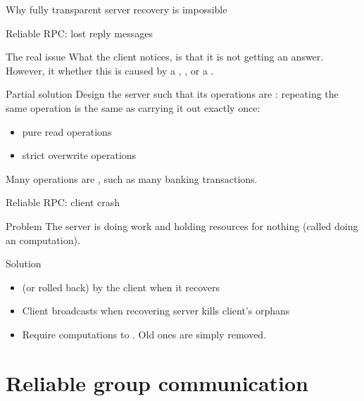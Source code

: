   \begin{slide}{Why fully transparent server recovery is impossible}
    \begin{centerfig}
    \end{centerfig}
  \end{slide}
\begin{slide}{Reliable RPC: lost reply messages}
  \begin{block}{The real issue}
    What the client notices, is that it is not getting an answer. However, it  whether
    this is caused by a , , or a .
  \end{block}
  \begin{block}{Partial solution}
    Design the server such that its operations are : repeating the same operation is the same
    as carrying it out exactly once:
    \begin{itemize}\tightlist
    \item pure read operations
    \item strict overwrite operations 
    \end{itemize}
    Many operations are , such as many banking transactions.
  \end{block}
\end{slide}
\begin{slide}{Reliable RPC: client crash}
  \begin{block}{Problem}
    The server is doing work and holding resources for nothing (called doing an  computation).
  \end{block}
  \begin{block}{Solution}
    \begin{itemize}
    \item {} (or rolled back) by the client when it recovers
    \item Client broadcasts  when recovering \mathexpr{\Rightarrow} server kills
      client's orphans
    \item Require computations to . Old ones are simply removed.
    \end{itemize}
  \end{block}
\end{slide}
\section{Reliable group communication}
